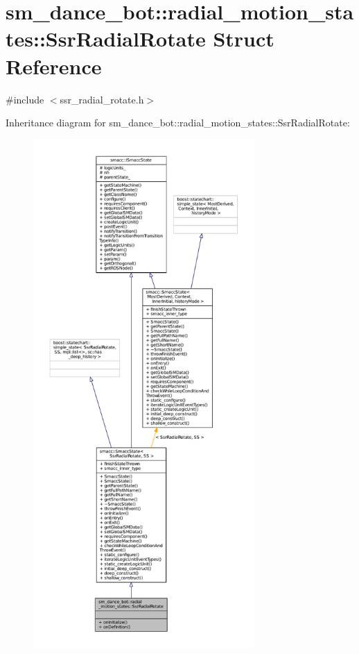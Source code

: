 \hypertarget{structsm__dance__bot_1_1radial__motion__states_1_1SsrRadialRotate}{}\section{sm\+\_\+dance\+\_\+bot\+:\+:radial\+\_\+motion\+\_\+states\+:\+:Ssr\+Radial\+Rotate Struct Reference}
\label{structsm__dance__bot_1_1radial__motion__states_1_1SsrRadialRotate}


{\ttfamily \#include $<$ssr\+\_\+radial\+\_\+rotate.\+h$>$}



Inheritance diagram for sm\+\_\+dance\+\_\+bot\+:\+:radial\+\_\+motion\+\_\+states\+:\+:Ssr\+Radial\+Rotate\+:
\nopagebreak
\begin{figure}[H]
\begin{center}
\leavevmode
\includegraphics[height=550pt]{structsm__dance__bot_1_1radial__motion__states_1_1SsrRadialRotate__inherit__graph}
\end{center}
\end{figure}


